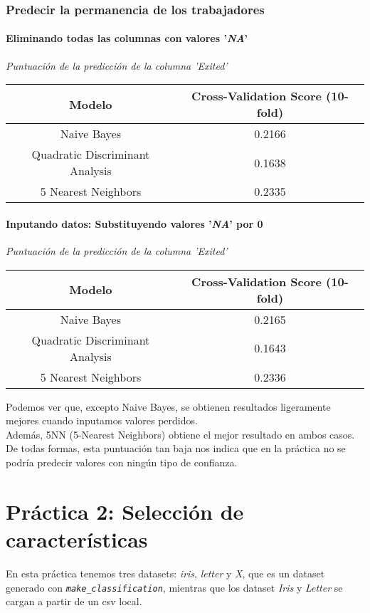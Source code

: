 \documentclass[
12pt, 
spanish, 
singlespacing,
headsepline
]{article}
\begin{document}
\subsubsection{Predecir la permanencia de los trabajadores}
\paragraph{Eliminando todas las columnas con valores '\textit{NA}'}

\begin{center}
\emph{Puntuación de la predicción de la columna 'Exited'}\\
\begin{tabular}{|c|c|}
\hline 
Modelo & Cross-Validation Score (10-fold) \\ 
\hline 
Naive Bayes & 0.2166\\ 
\hline 
Quadratic Discriminant Analysis & 0.1638\\ 
\hline 
5 Nearest Neighbors & 0.2335 \\ 
\hline 
\end{tabular}
\end{center}

\paragraph{Inputando datos: Substituyendo valores '\textit{NA}' por 0}
\begin{center}
\emph{Puntuación de la predicción de la columna 'Exited'}\\
\begin{tabular}{|c|c|}
\hline 
Modelo & Cross-Validation Score (10-fold) \\ 
\hline 
Naive Bayes & 0.2165\\ 
\hline 
Quadratic Discriminant Analysis & 0.1643\\ 
\hline 
5 Nearest Neighbors & 0.2336 \\ 
\hline 
\end{tabular}
\end{center}

Podemos ver que, excepto Naive Bayes, se obtienen resultados ligeramente mejores cuando inputamos valores perdidos.\\
Además, 5NN (5-Nearest Neighbors) obtiene el mejor resultado en ambos casos. De todas formas, esta puntuación tan baja nos indica que en la práctica no se podría predecir valores con ningún tipo de confianza.

\newpage
\section{Práctica 2: Selección de características}
En esta práctica tenemos tres datasets: \textit{iris}, \textit{letter} y \textit{X}, que es un dataset generado con \texttt{\textit{make_classification}}, mientras que los dataset \textit{Iris} y \textit{Letter} se cargan a partir de un csv local. 
\end{document}

